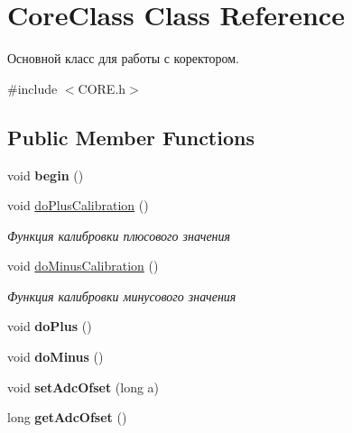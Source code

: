 \hypertarget{class_core_class}{\section{Core\-Class Class Reference}
\label{class_core_class}
}


Основной класс для работы с коректором.  




{\ttfamily \#include $<$C\-O\-R\-E.\-h$>$}

\subsection*{Public Member Functions}
\begin{DoxyCompactItemize}
\item 
\hypertarget{class_core_class_ad914b149c8a9d3fc9dfa451920c983e5}{void {\bfseries begin} ()}\label{class_core_class_ad914b149c8a9d3fc9dfa451920c983e5}

\item 
void \hyperlink{class_core_class_a20e5f2dc5c20265bb055e0d75a3a7f44}{do\-Plus\-Calibration} ()
\begin{DoxyCompactList}\small\item\em Функция калибровки плюсового значения \end{DoxyCompactList}\item 
\hypertarget{class_core_class_a77919f6f5a7b44d34bdd8b84d48b8000}{void \hyperlink{class_core_class_a77919f6f5a7b44d34bdd8b84d48b8000}{do\-Minus\-Calibration} ()}\label{class_core_class_a77919f6f5a7b44d34bdd8b84d48b8000}

\begin{DoxyCompactList}\small\item\em Функция калибровки минусового значения \end{DoxyCompactList}\item 
\hypertarget{class_core_class_aeb7da506c55533b54095d30598b88ef5}{void {\bfseries do\-Plus} ()}\label{class_core_class_aeb7da506c55533b54095d30598b88ef5}

\item 
\hypertarget{class_core_class_a73a7ab6063df4c0d5800af9a8135d20f}{void {\bfseries do\-Minus} ()}\label{class_core_class_a73a7ab6063df4c0d5800af9a8135d20f}

\item 
\hypertarget{class_core_class_a4e708cad4c776ee87a6c20aaeb454e65}{void {\bfseries set\-Adc\-Ofset} (long a)}\label{class_core_class_a4e708cad4c776ee87a6c20aaeb454e65}

\item 
\hypertarget{class_core_class_aea1e0015d419b376aa4a9625ab5e9cb5}{long {\bfseries get\-Adc\-Ofset} ()}\label{class_core_class_aea1e0015d419b376aa4a9625ab5e9cb5}

\end{DoxyCompactItemize}


